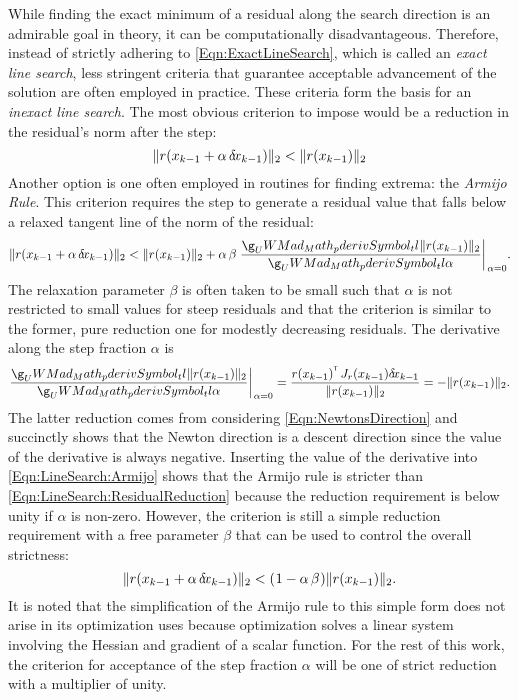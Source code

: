 \documentclass[12pt]{UWMadThesis}
\begin{document}
While finding the exact minimum of a residual along the search direction is an admirable goal in theory, it can be computationally disadvantageous.
Therefore, instead of strictly adhering to \cref{Eqn:ExactLineSearch}, which is called an \textit{exact line search}, less stringent criteria that guarantee acceptable advancement of the solution are often employed in practice.
These criteria form the basis for an \textit{inexact line search}.
The most obvious criterion to impose would be a reduction in the residual's norm after the step:
\begin{equation}
    \|r(x_{k-1} + \alpha\,\delta \mkern-3.00mu x_{k-1})\|_2 < \|r(x_{k-1})\|_2
    \label{Eqn:LineSearch:ResidualReduction}
\end{equation}
Another option is one often employed in routines for finding extrema: the \textit{Armijo Rule}.
This criterion requires the step to generate a residual value that falls below a relaxed tangent line of the norm of the residual:
\begin{equation}
    \|r(x_{k-1} + \alpha\,\dx_{k-1})\|_2 
    <
    \|r(x_{k-1})\|_2 + \alpha\,\beta\;\pderiv{\|r(x_{k-1})\|_2}{\alpha}\biggr\rvert_{\alpha=0}.
    \label{Eqn:LineSearch:Armijo}
\end{equation}
The relaxation parameter $\beta$ is often taken to be small such that $\alpha$ is not restricted to small values for steep residuals and that the criterion is similar to the former, pure reduction one for modestly decreasing residuals.
The derivative along the step fraction $\alpha$ is 
\begin{equation}
    \pderiv{\|r(x_{k-1})\|_2}{\alpha}\biggr\rvert_{\alpha=0} =
        \frac{\transpose{r(x_{k-1})}\,J_r(x_{k-1})\dx_{k-1}}{\|r(x_{k-1})\|_2} =
        -\|r(x_{k-1})\|_2.
\end{equation}
The latter reduction comes from considering \cref{Eqn:NewtonsDirection} and succinctly shows that the Newton direction is a descent direction since the value of the derivative is always negative.
Inserting the value of the derivative into \cref{Eqn:LineSearch:Armijo} shows that the Armijo rule is stricter than \cref{Eqn:LineSearch:ResidualReduction} because the reduction requirement is below unity if $\alpha$ is non-zero.
However, the criterion is still a simple reduction requirement with a free parameter $\beta$ that can be used to control the overall strictness:
\begin{equation}
    \|r(x_{k-1} + \alpha\,\dx_{k-1})\|_2 
    <
    \left(1 - \alpha\,\beta\right)\|r(x_{k-1})\|_2.
\end{equation}
It is noted that the simplification of the Armijo rule to this simple form does not arise in its optimization uses because optimization solves a linear system involving the Hessian and gradient of a scalar function.
For the rest of this work, the criterion for acceptance of the step fraction $\alpha$ will be one of strict reduction with a multiplier of unity.
\end{document}
